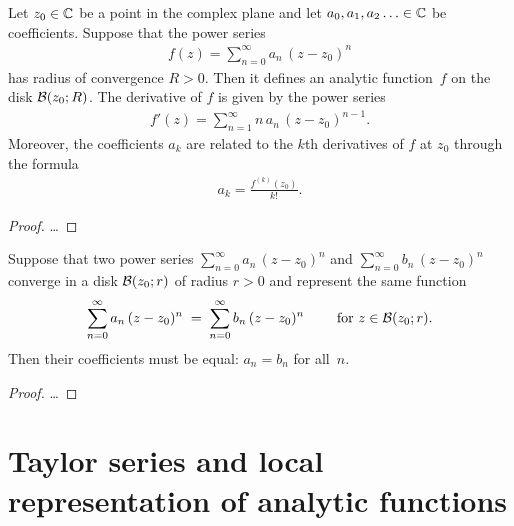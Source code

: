 \begin{lemma}
  \label{lem:power_series_analytic}
  Let $z_0 \in \bC$ be a point in the complex plane
  and let $a_0,a_1,a_2\ldots \in \bC$ be coefficients.
  Suppose that the power series
  \begin{align*}
    f(z) = \sum_{n=0}^\infty a_n \, (z-z_0)^n
  \end{align*}
  has radius of convergence $R > 0$.
  Then it defines an analytic function~$f$ on the disk $\DiskRC{R}{z_0}$.
  The derivative of $f$ is given by the power series
  \begin{align*}
    f'(z) = \sum_{n=1}^\infty n \, a_n \, (z-z_0)^{n-1} .
  \end{align*}
  Moreover, the coefficients $a_k$ are related to the $k$th derivatives of $f$
  at $z_0$ through the formula
  \begin{align*}
    a_k = \frac{f^{(k)}(z_0)}{k!} .
  \end{align*}
\end{lemma}
\begin{proof}
  \ldots
\end{proof}

\begin{lemma}
  \label{lem:power_series_uniqueness}
  Suppose that two power series $\sum_{n=0}^\infty a_n \, (z-z_0)^n$
  and $\sum_{n=0}^\infty b_n \, (z-z_0)^n$
  converge in a disk $\DiskRC{r}{z_0}$ of radius $r > 0$
  and represent the same function
  \begin{align*}
    \sum_{n=0}^\infty a_n \, (z-z_0)^n
    \; = \; \sum_{n=0}^\infty b_n \, (z-z_0)^n
    \qquad \text{ for } z \in \DiskRC{r}{z_0} .
  \end{align*}
  Then their coefficients must be equal:
  $a_n = b_n$ for all~$n$.
\end{lemma}
\begin{proof}
  \ldots
\end{proof}



\section{Taylor series and local representation of analytic functions}

